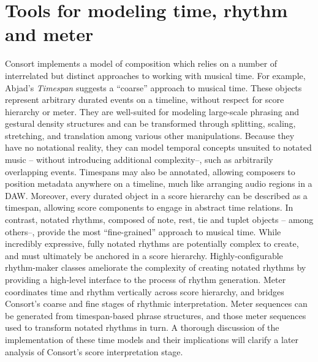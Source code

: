 \chapter{Tools for modeling time, rhythm and meter}
\label{chap:time-tools}

\begin{comment}
<abjad>[hide=true]
import collections
import consort
</abjad>
\end{comment}

Consort implements a model of composition which relies on a number of
interrelated but distinct approaches to working with musical time. For example,
Abjad's \emph{Timespan} suggests a \enquote{coarse} approach to musical
time. These objects represent arbitrary durated events on a timeline, without
respect for score hierarchy or meter. They are well-suited for modeling
large-scale phrasing and gestural density structures and can be transformed
through splitting, scaling, stretching, and translation among various other
manipulations. Because they have no notational reality, they can model
temporal concepts unsuited to notated music -- without introducing additional
complexity--, such as arbitrarily overlapping events. Timespans may also be
annotated, allowing composers to position metadata anywhere on a timeline, much
like arranging audio regions in a DAW.\cite{curtis1996computer} Moreover, every
durated object in a score hierarchy can be described as a timespan, allowing
score components to engage in abstract time relations. In contrast, notated
rhythms, composed of note, rest, tie and tuplet objects -- among others--,
provide the most \enquote{fine-grained} approach to musical time. While
incredibly expressive, fully notated rhythms are potentially complex to create,
and must ultimately be anchored in a score hierarchy. Highly-configurable
rhythm-maker classes ameliorate the complexity of creating notated rhythms by
providing a high-level interface to the process of rhythm generation. Meter
coordinates time and rhythm vertically across score hierarchy, and bridges
Consort's coarse and fine stages of rhythmic interpretation. Meter sequences
can be generated from timespan-based phrase structures, and those meter
sequences used to transform notated rhythms in turn. A thorough discussion of
the implementation of these time models and their implications will clarify a
later analysis of Consort's score interpretation stage.

